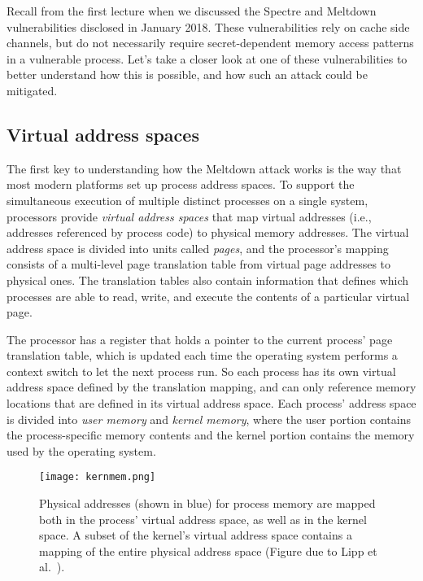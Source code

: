 \documentclass[11pt,twoside]{scrartcl}
\begin{document}
Recall from the first lecture when we discussed the Spectre and Meltdown vulnerabilities disclosed in January 2018. These vulnerabilities rely on cache side channels, but do not necessarily require secret-dependent memory access patterns in a vulnerable process. Let's take a closer look at one of these vulnerabilities to better understand how this is possible, and how such an attack could be mitigated.

\subsection{Virtual address spaces}

The first key to understanding how the Meltdown attack works is the way that most modern platforms set up process address spaces. To support the simultaneous execution of multiple distinct processes on a single system, processors provide \emph{virtual address spaces} that map virtual addresses (i.e., addresses referenced by process code) to physical memory addresses. The virtual address space is divided into units called \emph{pages}, and the processor's mapping consists of a multi-level page translation table from virtual page addresses to physical ones. The translation tables also contain information that defines which processes are able to read, write, and execute the contents of a particular virtual page.

The processor has a register that holds a pointer to the current process' page translation table, which is updated each time the operating system performs a context switch to let the next process run. So each process has its own virtual address space defined by the translation mapping, and can only reference memory locations that are defined in its virtual address space. Each process' address space is divided into \emph{user memory} and \emph{kernel memory}, where the user portion contains the process-specific memory contents and the kernel portion contains the memory used by the operating system. 

\begin{figure}
\centering
\texttt{[image: kernmem.png]}

\caption{Physical addresses (shown in blue) for process memory are mapped both in the process' virtual address space, as well as in the kernel space. A subset of the kernel's virtual address space contains a mapping of the entire physical address space (Figure due to Lipp et al.~\cite{Lipp18}).}
\end{figure}
\end{document}
